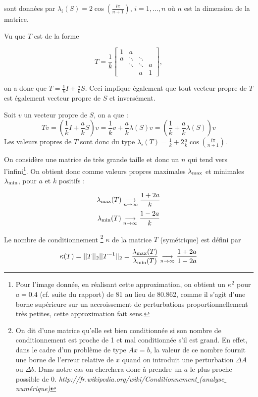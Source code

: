 sont données par $\lambda_i(S) = 2 \cos(\frac{i\pi}{n+1})$, $i= 1, \ldots , n$ où $n$ est la dimension de la matrice.

Vu que $T$ est de la forme

$$
 T = \frac{1}{k}
 \begin{bmatrix}
    1 & a 		& 			& \\
    a & \ddots 	& \ddots 	& \\
      & \ddots 	& \ddots 	& a \\
      & 		& a			& 1
  \end{bmatrix},
$$

on a donc que $T = \frac{1}{k} I + \frac{a}{k} S$. Ceci implique également que tout vecteur propre de $T$ est également vecteur propre de $S$ et inversément.

Soit $v$ un vecteur propre de $S$, on a que :
\begin{equation}
T v = \left( \frac{1}{k} I + \frac{a}{k} S \right) v =
\frac{1}{k} v + \frac{a}{k} \lambda(S) v = \left(\frac{1}{k} + \frac{a}{k} \lambda(S)\right) v
\end{equation}
Les valeurs propres de $T$ sont donc du type $\lambda_i(T) = \frac{1}{k} + 2 \frac{a}{k} \cos(\frac{i\pi}{n+1})$.

On considère une matrice de très grande taille et donc un $n$ qui tend vers l'infini\footnote{ Pour l'image donnée, en réalisant cette approximation, on obtient un $\kappa^2 $ pour $a = 0.4$ (cf. suite du rapport) de  81 au lieu de 80.862, comme il s'agit d'une borne supérieure sur un accroissement de perturbations proportionnellement très petites, cette approximation fait sens.}. 
On obtient donc comme valeurs propres maximales $\lambda_\mathrm{max}$ et minimales $\lambda_\mathrm{min}$,
pour $a$ et $k$ positifs :

$$\lambda_\mathrm{max}(T) \underset{n\rightarrow \infty}{\longrightarrow} \frac{1+2a}{k} $$
$$\lambda_\mathrm{min} (T) \underset{n\rightarrow \infty}{\longrightarrow} \frac{1-2a}{k} $$

Le nombre de conditionnement
\footnote{On dit d'une matrice qu'elle est bien conditionnée si son nombre de conditionnement est proche de 1 et mal conditionnée s'il est grand.
En effet, dans le cadre d'un problème de type $Ax = b$,
la valeur de ce nombre fournit une borne de l'erreur relative de $x$ quand on introduit une perturbation $\Delta A $ ou $\Delta b$.
Dans notre cas on cherchera donc à prendre un $a$ le plus proche possible de 0.
\textit{http://fr.wikipedia.org/wiki/Conditionnement$\_$(analyse$\_$numérique)}}
 $\kappa$ de la matrice $T$ (symétrique) est défini par
\begin{equation}
	\kappa (T) = ||T||_2||T^{-1}||_2 = \frac{\lambda_\mathrm{max} (T)}{\lambda_\mathrm{min} (T)} \underset{n\rightarrow \infty}{\longrightarrow} \frac{1+2a}{1-2a}
\end{equation}

